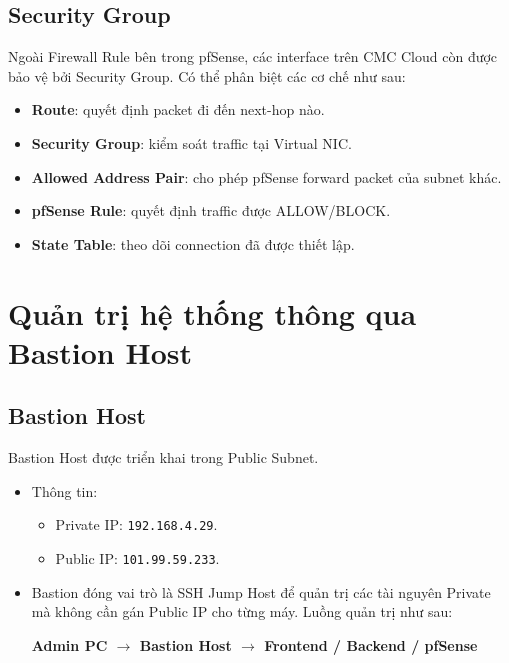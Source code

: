 \documentclass[12pt, a4paper]{article}
\begin{document}
\subsection{Security Group}

Ngoài Firewall Rule bên trong pfSense, các interface trên CMC Cloud còn được bảo vệ bởi Security Group. Có thể phân biệt các cơ chế như sau:

\begin{itemize}
    \item \textbf{Route}: quyết định packet đi đến next-hop nào.
    \item \textbf{Security Group}: kiểm soát traffic tại Virtual NIC.
    \item \textbf{Allowed Address Pair}: cho phép pfSense forward
    packet của subnet khác.
    \item \textbf{pfSense Rule}: quyết định traffic được ALLOW/BLOCK.
    \item \textbf{State Table}: theo dõi connection đã được thiết lập.
\end{itemize}


\section{Quản trị hệ thống thông qua Bastion Host}

\subsection{Bastion Host}
Bastion Host được triển khai trong Public Subnet.
\begin{itemize}

\item Thông tin:

        \begin{itemize}
            \item Private IP: \texttt{192.168.4.29}.
            \item Public IP: \texttt{101.99.59.233}.
        \end{itemize}

\item Bastion đóng vai trò là SSH Jump Host để quản trị các tài nguyên
Private mà không cần gán Public IP cho từng máy. Luồng quản trị như sau:

\begin{center}
\textbf{
Admin PC
$\rightarrow$
Bastion Host
$\rightarrow$
Frontend / Backend / pfSense
}
\end{center}

\end{itemize}
\end{document}
